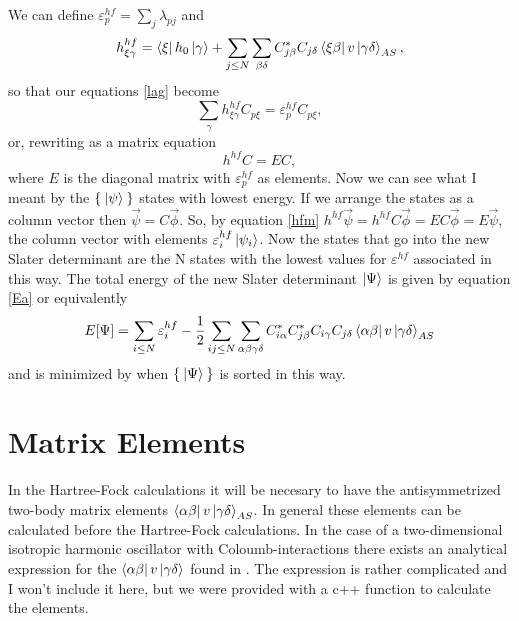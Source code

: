 \documentclass[a4paper,english,12pt]{article}
\newcommand{\be}{\begin{equation}}
\newcommand{\ee}{\end{equation}}
\renewcommand{\epsilon}{\varepsilon}
\begin{document}
We can define \( \epsilon_p^{hf}=\sum_j\lambda_{pj} \) and
\be\label{hfd}
 h_{\xi\gamma}^{hf}=\bra{\xi}h_0\ket{\gamma}+\sum_{j\leq N}\sum_{\beta\delta}C_{j\beta}^*C_{j\delta}\bra{\xi\beta}v\ket{\gamma\delta}_{AS},
\ee
so that our equations \ref{lag} become
\be\label{hfi}
\sum_\gamma h_{\xi\gamma}^{hf}C_{p\xi} = \epsilon^{hf}_{p}C_{p\xi},
\ee
or, rewriting as a matrix equation
\be\label{hfm}
h^{hf}C = E C,
\ee
where $E$ is the diagonal matrix with $\epsilon^{hf}_p$ as elements.
Now we can see what I meant by the $\Set{\Ket{\psi}}$ states with lowest energy. If we arrange the states as a column vector then
\(\vec{\psi} = C\vec{\phi}\). So, by equation \ref{hfm} \(h^{hf}\vec{\psi} = h^{hf}C\vec{\phi} = EC\vec{\phi} = E\vec{\psi}\), the column vector with elements
\(\epsilon^{hf}_i\ket{\psi_i}\). Now the states that go into the new Slater determinant are the N states with the lowest values for $\epsilon^{hf}$ associated in this way.
The total energy of the new Slater determinant \(\Ket{\Psi}\) is given by equation \ref{Ea} or equivalently
\be\label{Ep}
E[\Psi] = \sum_{i\leq N}\epsilon^{hf}_i -
\frac{1}{2}\sum_{ij\leq N}\sum_{\alpha\beta\gamma\delta}C_{i\alpha}^*C_{j\beta}^*C_{i\gamma}C_{j\delta}\bra{\alpha\beta}v\ket{\gamma\delta}_{AS}
\ee
and is minimized by when $\Set{\Ket{\Psi}}$ is sorted in this way.

\section{Matrix Elements}
In the Hartree-Fock calculations it will be necesary to have the antisymmetrized two-body matrix elements $\bra{\alpha\beta}v\ket{\gamma\delta}_{AS}$.
In general these elements can be calculated before the Hartree-Fock calculations. In the case of a two-dimensional isotropic harmonic oscillator
with Coloumb-interactions there exists an analytical expression for the $\bra{\alpha\beta}v\ket{\gamma\delta}$ found in \cite{analytho}. The expression is rather complicated and I won't
include it here, but we were provided with a c++ function to calculate the elements.

  
\end{document}
